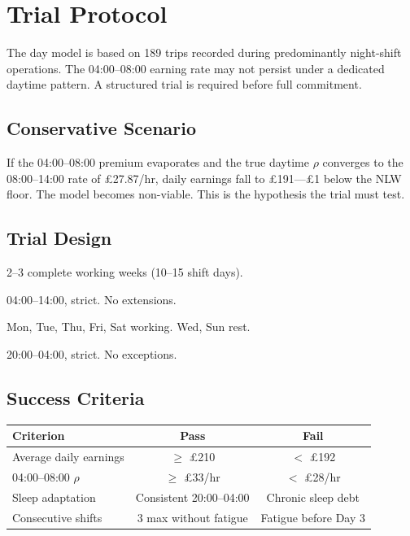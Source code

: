 \documentclass[a4paper,11pt]{article}
\begin{document}
\newpage

\section{Trial Protocol}

The day model is based on 189 trips recorded during predominantly night-shift operations. The 04:00--08:00 earning rate may not persist under a dedicated daytime pattern. A structured trial is required before full commitment.

\subsection{Conservative Scenario}

If the 04:00--08:00 premium evaporates and the true daytime $\rho$ converges to the 08:00--14:00 rate of \pounds27.87/hr, daily earnings fall to \pounds191---\pounds1 below the NLW floor. The model becomes non-viable. This is the hypothesis the trial must test.

\subsection{Trial Design}

\begin{description}[leftmargin=2em, style=nextline]
\item[\textbf{Duration:}] 2--3 complete working weeks (10--15 shift days).
\item[\textbf{Window:}] 04:00--14:00, strict. No extensions.
\item[\textbf{Schedule:}] Mon, Tue, Thu, Fri, Sat working. Wed, Sun rest.
\item[\textbf{Sleep:}] 20:00--04:00, strict. No exceptions.
\end{description}

\subsection{Success Criteria}

\begin{tabularx}{\textwidth}{X C C}
\toprule
\textbf{Criterion} & \textbf{Pass} & \textbf{Fail} \\
\midrule
Average daily earnings & $\geq$ \pounds210 & $<$ \pounds192 \\
04:00--08:00 $\rho$ & $\geq$ \pounds33/hr & $<$ \pounds28/hr \\
Sleep adaptation & Consistent 20:00--04:00 & Chronic sleep debt \\
Consecutive shifts & 3 max without fatigue & Fatigue before Day 3 \\
\bottomrule
\end{tabularx}
\end{document}
